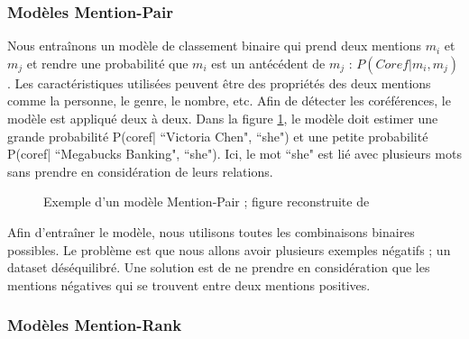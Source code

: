 \documentclass{KodeBook}
\begin{document}
\subsubsection{Modèles Mention-Pair}

Nous entraînons un modèle de classement binaire qui prend deux mentions $m_i$ et $m_j$ et rendre une probabilité que $m_i$ est un antécédent de $m_j$ : $P(Coref|m_i, m_j)$. 
Les caractéristiques utilisées peuvent être des propriétés des deux mentions comme la personne, le genre, le nombre, etc.
Afin de détecter les coréférences, le modèle est appliqué deux à deux.
Dans la figure \ref{fig:mention-pair-exp}, le modèle doit estimer une grande probabilité P(coref| ``Victoria Chen", ``she") et une petite probabilité P(coref| ``Megabucks Banking", ``she").
Ici, le mot ``she" est lié avec plusieurs mots sans prendre en considération de leurs relations.

\begin{figure}[ht]
	\centering
	\caption[Exemple d'un modèle Mention-Pair]{Exemple d'un modèle Mention-Pair ; figure reconstruite de \cite{2019-jurafsky-martin}}
	\label{fig:mention-pair-exp}
\end{figure}

Afin d'entraîner le modèle, nous utilisons toutes les combinaisons binaires possibles.
Le problème est que nous allons avoir plusieurs exemples négatifs ; un dataset déséquilibré. 
Une solution est de ne prendre en considération que les mentions négatives qui se trouvent entre deux mentions positives.

\subsubsection{Modèles Mention-Rank}
\end{document}
